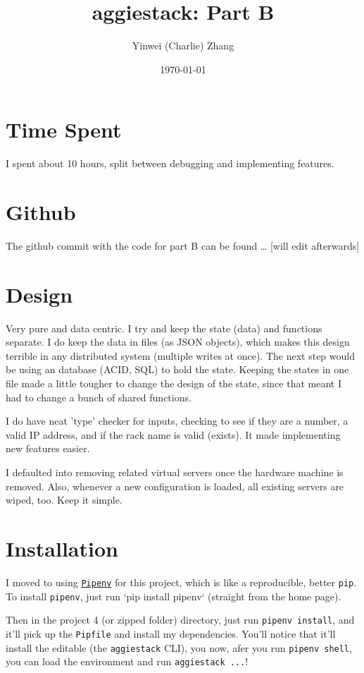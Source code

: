 \documentclass[11pt]{article}
\author{Yinwei (Charlie) Zhang}
\date{\today}
\title{aggiestack: Part B}
\begin{document}
\maketitle
\tableofcontents


\section{Time Spent}
\label{sec:orgbda06da}
I spent about 10 hours, split between debugging and implementing features.
\section{Github}
\label{sec:org1ff2269}
The github commit with the code for part B can be found \ldots{} [will edit afterwards]
\section{Design}
\label{sec:orga350052}
Very pure and data centric.  I try and keep the state (data) and functions separate.  I do keep the data in files (as JSON objects), which makes this design terrible in any distributed system (multiple writes at once).  The next step would be using an database (ACID, SQL) to hold the state.  Keeping the states in one file made a little tougher to change the design of the state, since that meant I had to change a bunch of shared functions.

I do have neat 'type' checker for inputs, checking to see if they are a number, a valid IP address, and if the rack name is valid (exists).  It made implementing new features easier.

I defaulted into removing related virtual servers once the hardware machine is removed.  Also, whenever a new configuration is loaded, all existing servers are wiped, too.  Keep it simple.

\section{Installation}
\label{sec:orga703f86}
I moved to using \href{https://docs.pipenv.org/}{\texttt{Pipenv}} for this project, which is like a reproducible, better \texttt{pip}.  To install \texttt{pipenv}, just run `pip install pipenv` (straight from the home page).

Then in the project 4 (or zipped folder) directory, just run \texttt{pipenv install}, and it'll pick up the \texttt{Pipfile} and install my dependencies.  You'll notice that it'll install the editable (the \texttt{aggiestack} CLI), you now, afer you run \texttt{pipenv shell}, you can load the environment and run \texttt{aggiestack ...}!  
\end{document}
